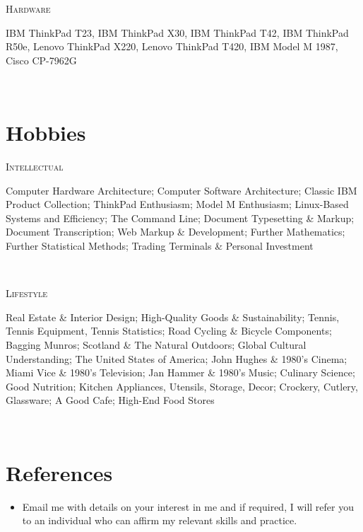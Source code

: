 \documentclass[11pt, english]{article}
\begin{document}
{\begin{minipage}[t]{.15\linewidth}
        \hfill                  
        \textsc{Hardware}    
\end{minipage}
\hfill\vline\hfill
\begin{minipage}[t]{.80\linewidth}
	IBM ThinkPad T23, IBM ThinkPad X30, IBM ThinkPad T42, IBM ThinkPad R50e, Lenovo ThinkPad X220, Lenovo ThinkPad T420, IBM Model M 1987, Cisco CP-7962G
\end{minipage}\\

\section*{Hobbies}

\begin{minipage}[t]{.15\linewidth}
        \hfill                  
        \textsc{Intellectual}    
\end{minipage}
\hfill\vline\hfill
\begin{minipage}[t]{.80\linewidth}
	Computer Hardware Architecture; Computer Software Architecture; Classic IBM Product Collection; ThinkPad Enthusiasm; Model M Enthusiasm; Linux-Based Systems and Efficiency; The Command Line; Document Typesetting \& Markup; Document Transcription; Web Markup \& Development; Further Mathematics; Further Statistical Methods; Trading Terminals \& Personal Investment
\end{minipage}\\

\begin{minipage}[t]{.15\linewidth}
        \hfill                  
	\textsc{Lifestyle}      
\end{minipage}
\hfill\vline\hfill
\begin{minipage}[t]{.80\linewidth}
	Real Estate \& Interior Design; High-Quality Goods \& Sustainability; Tennis, Tennis Equipment, Tennis Statistics; Road Cycling \& Bicycle Components; Bagging Munros; Scotland \& The Natural Outdoors; Global Cultural Understanding; The United States of America; John Hughes \& 1980's Cinema; Miami Vice \& 1980's Television; Jan Hammer \& 1980's Music; Culinary Science; Good Nutrition; Kitchen Appliances, Utensils, Storage, Decor; Crockery, Cutlery, Glassware; A Good Cafe; High-End Food Stores
\end{minipage}\\

\section{References}

\begin{itemize}
\setlength\itemsep{0cm}
        \item Email me with details on your interest in me and if required, I will refer you to an individual who can affirm my relevant skills and practice.
\end{itemize}

}
\end{document}
